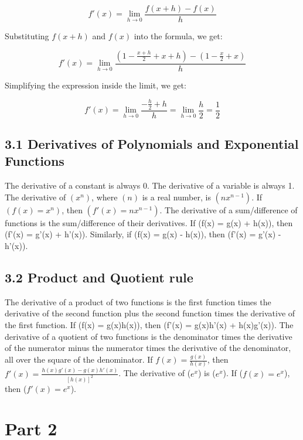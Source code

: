 \documentclass{article}
\begin{document}
\[f'(x) = \lim_{h \to 0} \frac{f(x + h) - f(x)}{h}\]

Substituting \(f(x + h)\) and \(f(x)\) into the formula, we get:

\[f'(x) = \lim_{h \to 0} \frac{(1 - \frac{x + h}{2} + x + h) - (1 - \frac{x}{2} + x)}{h}\]

Simplifying the expression inside the limit, we get:

\[f'(x) = \lim_{h \to 0} \frac{-\frac{h}{2} + h}{h} = \lim_{h \to 0} \frac{h}{2} = \frac{1}{2}\]

\subsection{3.1 Derivatives of Polynomials and Exponential Functions}
The derivative of a constant is always 0. The derivative of a variable is always 1.
The derivative of $(x^n)$, where $(n)$ is a real number, is $(nx^{n-1})$. If $(f(x) = x^n)$, then $(f'(x) = nx^{n-1})$.
The derivative of a sum/difference of functions is the sum/difference of their derivatives. If (f(x) = g(x) + h(x)), then (f'(x) = g'(x) + h'(x)). Similarly, if (f(x) = g(x) - h(x)), then (f'(x) = g'(x) - h'(x)).
\subsection{3.2 Product and Quotient rule}
The derivative of a product of two functions is the first function times the derivative of the second function plus the second function times the derivative of the first function. If (f(x) = g(x)h(x)), then (f'(x) = g(x)h'(x) + h(x)g'(x)).
The derivative of a quotient of two functions is the denominator times the derivative of the numerator minus the numerator times the derivative of the denominator, all over the square of the denominator. If \(f(x) = \frac{{g(x)}}{{h(x)}}\), then \(f'(x) = \frac{{h(x)g'(x) - g(x)h'(x)}}{{[h(x)]^2}}\).
The derivative of ($e^x$) is ($e^x$). If ($f(x) = e^x$), then ($f'(x) = e^x$).

\section{Part 2}
\end{document}
